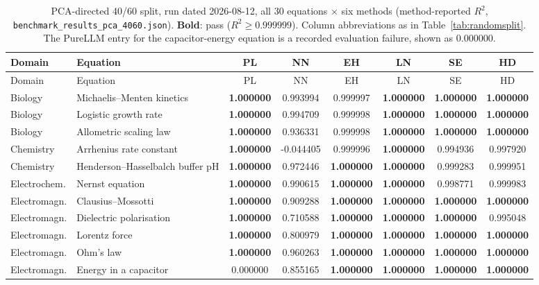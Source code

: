 \documentclass[twoside,11pt]{article}
\newcommand{\Rsq}{R^{2}}
\begin{document}
{\scriptsize\setlength{\tabcolsep}{2.5pt}
\begin{longtable}{p{1.9cm}p{4.3cm}cccccc}
\caption{PCA-directed 40/60 split, run dated 2026-08-12, all 30 equations $\times$ six methods (method-reported $\Rsq$, \texttt{benchmark\_results\_pca\_4060.json}). \textbf{Bold}: pass ($\Rsq \geq 0.999999$). Column abbreviations as in Table~\ref{tab:randomsplit}. The PureLLM entry for the capacitor-energy equation is a recorded evaluation failure, shown as $0.000000$.}
\label{tab:pcasplit}\\
\toprule
Domain & Equation & PL & NN & EH & LN & SE & HD \\
\midrule
\endfirsthead
\toprule
Domain & Equation & PL & NN & EH & LN & SE & HD \\
\midrule
\endhead
Biology & Michaelis--Menten kinetics & \textbf{1.000000} & 0.993994 & 0.999997 & \textbf{1.000000} & \textbf{1.000000} & \textbf{1.000000} \\
Biology & Logistic growth rate & \textbf{1.000000} & 0.994709 & 0.999998 & \textbf{1.000000} & \textbf{1.000000} & \textbf{1.000000} \\
Biology & Allometric scaling law & \textbf{1.000000} & 0.936331 & 0.999998 & \textbf{1.000000} & \textbf{1.000000} & \textbf{1.000000} \\
Chemistry & Arrhenius rate constant & \textbf{1.000000} & -0.044405 & 0.999996 & \textbf{1.000000} & 0.994936 & 0.997920 \\
Chemistry & Henderson--Hasselbalch buffer pH & \textbf{1.000000} & 0.972446 & \textbf{1.000000} & \textbf{1.000000} & 0.999283 & 0.999951 \\
Electrochem. & Nernst equation & \textbf{1.000000} & 0.990615 & \textbf{1.000000} & \textbf{1.000000} & 0.998771 & 0.999983 \\
Electromagn. & Clausius--Mossotti & \textbf{1.000000} & 0.909288 & \textbf{1.000000} & \textbf{1.000000} & \textbf{1.000000} & \textbf{1.000000} \\
Electromagn. & Dielectric polarisation & \textbf{1.000000} & 0.710588 & \textbf{1.000000} & \textbf{1.000000} & \textbf{1.000000} & 0.995048 \\
Electromagn. & Lorentz force & \textbf{1.000000} & 0.800979 & \textbf{1.000000} & \textbf{1.000000} & \textbf{1.000000} & \textbf{1.000000} \\
Electromagn. & Ohm's law & \textbf{1.000000} & 0.960263 & \textbf{1.000000} & \textbf{1.000000} & \textbf{1.000000} & \textbf{1.000000} \\
Electromagn. & Energy in a capacitor & 0.000000 & 0.855165 & \textbf{1.000000} & \textbf{1.000000} & \textbf{1.000000} & \textbf{1.000000} \\

\end{longtable}}
\end{document}
